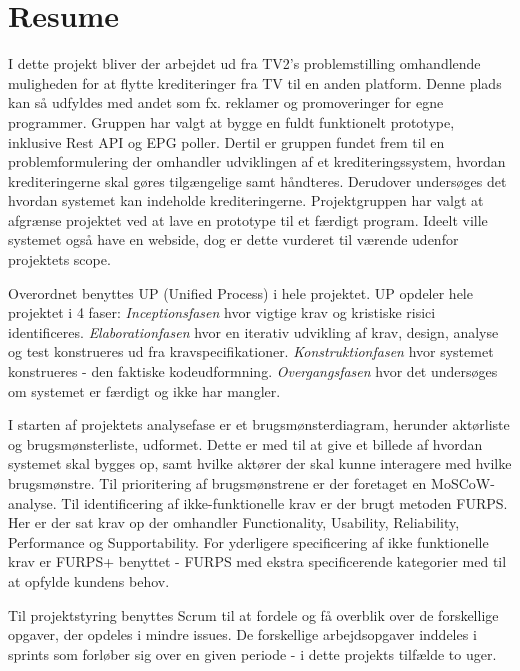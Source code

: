 \section{Resume}

I dette projekt bliver der arbejdet ud fra TV2's problemstilling omhandlende muligheden for at flytte krediteringer fra TV til en anden platform. Denne plads kan så udfyldes med andet som fx. reklamer og promoveringer for egne programmer. Gruppen har valgt at bygge en fuldt funktionelt prototype, inklusive Rest API og EPG poller. Dertil er gruppen fundet frem til en problemformulering der omhandler udviklingen af et krediteringssystem, hvordan krediteringerne skal gøres tilgængelige samt håndteres. Derudover undersøges det hvordan systemet kan indeholde krediteringerne.
Projektgruppen har valgt at afgrænse projektet ved at lave en prototype til et færdigt program. Ideelt ville systemet også have en webside, dog er dette vurderet til værende udenfor projektets scope.

Overordnet benyttes UP (Unified Process) i hele projektet. UP opdeler hele projektet i 4 faser: \textit{Inceptionsfasen} hvor vigtige krav og kristiske risici identificeres. \textit{Elaborationfasen} hvor en iterativ udvikling af krav, design, analyse og test konstrueres ud fra kravspecifikationer. \textit{Konstruktionfasen} hvor systemet konstrueres - den faktiske kodeudformning. \textit{Overgangsfasen} hvor det undersøges om systemet er færdigt og ikke har mangler.

I starten af projektets analysefase er et brugsmønsterdiagram, herunder aktørliste og brugs\-møn\-ster\-li\-ste, udformet. Dette er med til at give et billede af hvordan systemet skal bygges op, samt hvilke aktører der skal kunne interagere med hvilke brugsmønstre. Til prioritering af brugsmønstrene er der foretaget en MoSCoW-analyse.
Til identificering af ikke-funktionelle krav er der brugt metoden FURPS. Her er der sat krav op der omhandler Functionality, Usability, Reliability, Performance og Supportability. For yderligere specificering af ikke funktionelle krav er FURPS+ benyttet - FURPS med ekstra specificerende kategorier med til at opfylde kundens behov.

Til projektstyring benyttes Scrum til at fordele og få overblik over de forskellige opgaver, der opdeles i mindre issues. De forskellige arbejdsopgaver inddeles i sprints som forløber sig over en given periode - i dette projekts tilfælde to uger.



